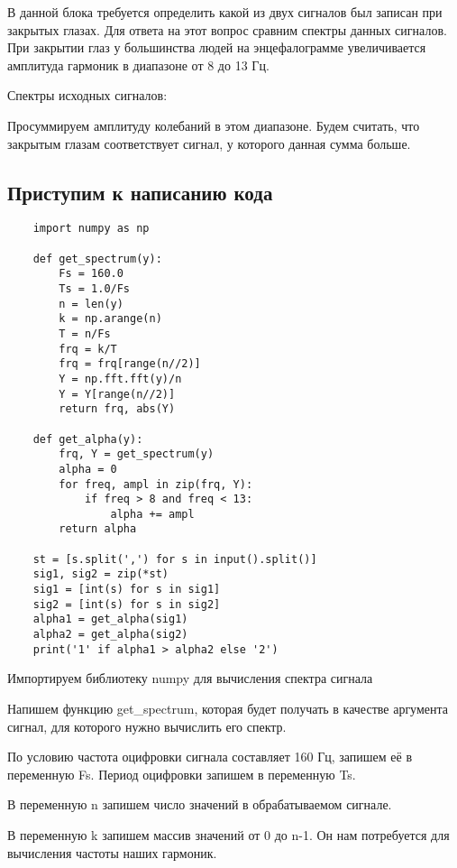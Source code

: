 \solutionSection

В данной блока требуется определить какой из двух сигналов был записан при закрытых глазах. Для ответа на этот вопрос сравним спектры данных сигналов. При закрытии глаз у большинства людей на энцефалограмме увеличивается амплитуда гармоник в диапазоне от 8 до 13 Гц.

Спектры исходных сигналов:


Просуммируем амплитуду колебаний в этом диапазоне. Будем считать, что закрытым глазам соответствует сигнал, у которого данная сумма больше.

\subsection*{Приступим к написанию кода}

\begin{verbatim}
    import numpy as np

    def get_spectrum(y):
        Fs = 160.0
        Ts = 1.0/Fs
        n = len(y)
        k = np.arange(n)
        T = n/Fs
        frq = k/T
        frq = frq[range(n//2)]
        Y = np.fft.fft(y)/n
        Y = Y[range(n//2)]
        return frq, abs(Y)

    def get_alpha(y):
        frq, Y = get_spectrum(y)
        alpha = 0
        for freq, ampl in zip(frq, Y):
            if freq > 8 and freq < 13:
                alpha += ampl
        return alpha

    st = [s.split(',') for s in input().split()]
    sig1, sig2 = zip(*st)
    sig1 = [int(s) for s in sig1]
    sig2 = [int(s) for s in sig2]
    alpha1 = get_alpha(sig1)
    alpha2 = get_alpha(sig2)
    print('1' if alpha1 > alpha2 else '2')
\end{verbatim}

Импортируем библиотеку numpy для вычисления спектра сигнала

Напишем функцию get\_spectrum, которая будет получать в качестве аргумента сигнал, для которого нужно вычислить его спектр.

По условию частота оцифровки сигнала составляет 160 Гц, запишем её в переменную Fs. Период оцифровки запишем в переменную Ts.

В переменную n запишем число значений в обрабатываемом сигнале.

В переменную k запишем массив значений от 0 до n-1. Он нам потребуется для вычисления частоты наших гармоник.

